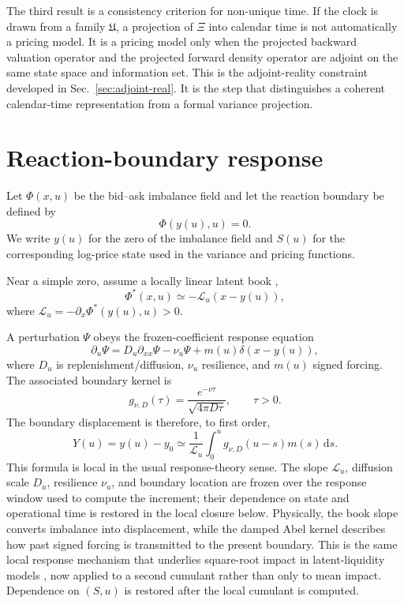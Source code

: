 \documentclass[11pt]{amsart}
\newcommand{\dd}{\,\mathrm{d}}
\newcommand{\cL}{\mathcal{L}}
\newcommand{\Xiop}{\Xi}
\theoremstyle{definition}
\theoremstyle{plain}
\theoremstyle{remark}
\begin{document}
The third result is a consistency criterion for non-unique time. If the clock is drawn from a family $\mathfrak U$, a projection of $\Xiop$ into calendar time is not automatically a pricing model. It is a pricing model only when the projected backward valuation operator and the projected forward density operator are adjoint on the same state space and information set. This is the adjoint-reality constraint developed in Sec.~\ref{sec:adjoint-real}. It is the step that distinguishes a coherent calendar-time representation from a formal variance projection.

\section{Reaction-boundary response}
Let $\Phi(x,u)$ be the bid--ask imbalance field and let the reaction boundary be defined by
\begin{equation}
 \Phi(y(u),u)=0.
 \label{eq:zero-boundary}
\end{equation}
We write $y(u)$ for the zero of the imbalance field and $S(u)$ for the corresponding log-price state used in the variance and pricing functions.

Near a simple zero, assume a locally linear latent book \cite{bouchaud2009markets,toth2011anomalous,Donier2015},
\begin{equation}
 \Phi^*(x,u)\simeq-\cL_u(x-y(u)),
  \label{eq:linear-book}
 \end{equation}
 where $\cL_u=-\partial_x\Phi^*(y(u),u)>0$.
 
A perturbation $\Psi$ obeys the frozen-coefficient response equation
\begin{equation}
 \partial_u\Psi=D_u\partial_{xx}\Psi-\nu_u\Psi+m(u)\delta(x-y(u)),
 \label{eq:response-pde}
\end{equation}
where $D_u$ is replenishment/diffusion, $\nu_u$ resilience, and $m(u)$ signed forcing. The associated boundary kernel is
\begin{equation}
 g_{\nu,D}(\tau)=\frac{e^{-\nu\tau}}{\sqrt{4\pi D\tau}},\qquad \tau>0.
 \label{eq:abel-kernel}
\end{equation}
The boundary displacement is therefore, to first order,
\begin{equation}
 Y(u)=y(u)-y_0\simeq\frac{1}{\cL_u}\int_0^u g_{\nu,D}(u-s)m(s)\dd s.
 \label{eq:linear-response}
\end{equation}
This formula is local in the usual response-theory sense. The slope $\cL_u$, diffusion scale $D_u$, resilience $\nu_u$, and boundary location are frozen over the response window used to compute the increment; their dependence on state and operational time is restored in the local closure below. Physically, the book slope converts imbalance into displacement, while the damped Abel kernel describes how past signed forcing is transmitted to the present boundary. This is the same local response mechanism that underlies square-root impact in latent-liquidity models \cite{Mastromatteo2014,Donier2015,Benzaquen2018}, now applied to a second cumulant rather than only to mean impact. Dependence on $(S,u)$ is restored after the local cumulant is computed.
\end{document}
